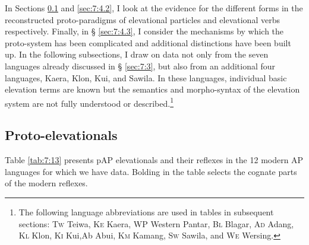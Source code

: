 In Sections \ref{sec:7:4.1} and \ref{sec:7:4.2}, I look at the evidence for the different forms in the reconstructed proto-paradigms of elevational particles and elevational verbs respectively. Finally, in {\S} \ref{sec:7:4.3}, I consider the mechanisms by which the proto-system has been complicated and additional distinctions have been built up. In the following subsections, I draw on data not only from the seven languages already discussed in {\S} \ref{sec:7:3}, but also from an additional four languages, Kaera, Klon, Kui, and Sawila. In these languages, individual basic elevation terms are known but the semantics and morpho-syntax of the elevation system are not fully understood or described.\footnote{The following language abbreviations are used in tables in subsequent sections: \textsc{Tw} Teiwa, \textsc{Ke} Kaera, \textsc{WP} Western Pantar, \textsc{Bl} Blagar, \textsc{Ad} Adang, \textsc{Kl} Klon, \textsc{Ki} Kui,\textsc Ab  Abui, \textsc{Km} Kamang, \textsc{Sw} Sawila, and \textsc{We} Wersing.} 

\subsection{Proto-elevationals}\label{sec:7:4.1}
Table \ref{tab:7:13} presents pAP elevationals and their reflexes in the 12 modern AP languages for which we have data. Bolding in the table selects the cognate parts of the modern reflexes.

 


